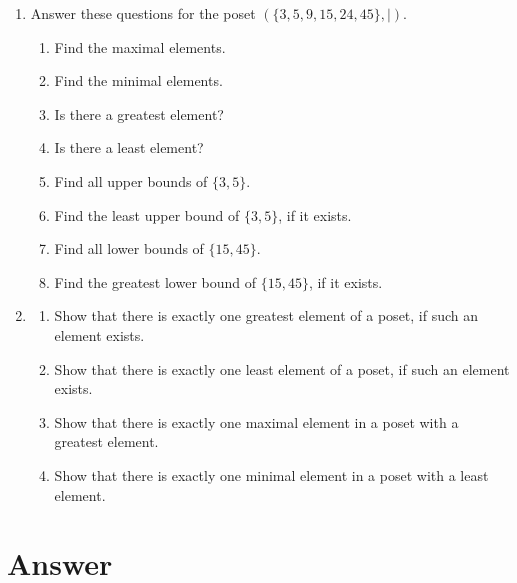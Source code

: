 \documentclass{../../cls/sig-alternate-05-2015}
\begin{document}
\begin{enumerate}
\item Answer these questions for the poset $(\{3, 5, 9, 15,	24, 45\}, \mid)$.
\begin{enumerate}
	\item Find the maximal elements.
	\item Find the minimal elements.
	\item Is there a greatest element?
	\item Is there a least element?
	\item Find all upper bounds of $\{3, 5\}$.
	\item Find the least upper bound of $\{3, 5\}$, if it exists.
	\item Find all lower bounds of $\{15, 45\}$.
	\item Find the greatest lower bound of $\{15, 45\}$, if it exists.
\end{enumerate}

\item 
	\begin{enumerate}
		\item Show that there is exactly one greatest element of a
		poset, if such an element exists.
		\item Show that there is exactly one least element of a poset,
		if such an element exists.
		\item Show that there is exactly one maximal element in a
		poset with a greatest element.
		\item Show that there is exactly one minimal element in a
		poset with a least element.
	\end{enumerate}
\end{enumerate}

\nocite{*}

 
\clearpage
\appendix
\section{Answer}
\end{document}
